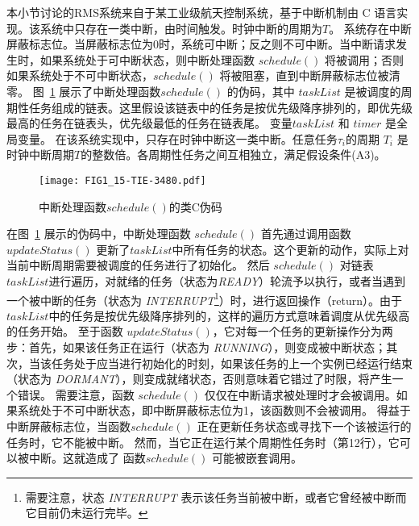 本小节讨论的RMS系统来自于某工业级航天控制系统，基于中断机制由 C 语言实现。该系统中只存在一类中断，由时间触发。时钟中断的周期为$T$。
系统存在中断屏蔽标志位。当屏蔽标志位为0时，系统可中断；反之则不可中断。当中断请求发生时，如果系统处于可中断状态，则中断处理函数
$\mathit{schedule()}$ 将被调用；否则如果系统处于不可中断状态，$\mathit{schedule()}$ 将被阻塞，直到中断屏蔽标志位被清零。
图~\ref{f:schedule} 展示了中断处理函数$\mathit{schedule()}$ 的伪码，其中
$\mathit{taskList}$ 是被调度的周期性任务组成的链表。这里假设该链表中的任务是按优先级降序排列的，即优先级最高的任务在链表头，优先级最低的任务在链表尾。
变量$\mathit{taskList}$ 和 $\mathit{timer}$ 是全局变量。
在该系统实现中，只存在时钟中断这一类中断。任意任务$\tau_i$的周期
$T_i$ 是时钟中断周期$T$的整数倍。各周期性任务之间互相独立，满足假设条件(A3)。
 
\begin{figure}[ht]
\centering
\texttt{[image: FIG1\_15-TIE-3480.pdf]}
\caption{中断处理函数$\mathit{schedule()}$的类C伪码}
\label{f:schedule}
\end{figure}

在图~\ref{f:schedule} 展示的伪码中，中断处理函数 $\mathit{schedule()}$
首先通过调用函数$\mathit{updateStatus()}$ 更新了$\mathit{taskList}$中所有任务的状态。这个更新的动作，实际上对当前中断周期需要被调度的任务进行了初始化。
然后
$\mathit{schedule()}$ 对链表$\mathit{taskList}$进行遍历，对就绪的任务（状态为\textit{READY}）轮流予以执行，或者当遇到一个被中断的任务（状态为 \textit{INTERRUPT}\footnote{需要注意，状态 \textit{INTERRUPT} 表示该任务当前被中断，或者它曾经被中断而它目前仍未运行完毕。}）时，进行返回操作（return）。由于$\mathit{taskList}$中的任务是按优先级降序排列的，这样的遍历方式意味着调度从优先级高的任务开始。 
至于函数 $\mathit{updateStatus()}$，它对每一个任务的更新操作分为两步：首先，如果该任务正在运行（状态为 \textit{RUNNING}），则变成被中断状态；其次，当该任务处于应当进行初始化的时刻，如果该任务的上一个实例已经运行结束（状态为 \textit{DORMANT}），则变成就绪状态，否则意味着它错过了时限，将产生一个错误。
需要注意，函数 $\mathit{schedule()}$ 仅仅在中断请求被处理时才会被调用。如果系统处于不可中断状态，即中断屏蔽标志位为1，该函数则不会被调用。
得益于中断屏蔽标志位，当函数$\mathit{schedule()}$ 正在更新任务状态或寻找下一个该被运行的任务时，它不能被中断。
然而，当它正在运行某个周期性任务时（第12行），它可以被中断。这就造成了
函数$\mathit{schedule()}$ 可能被嵌套调用。

